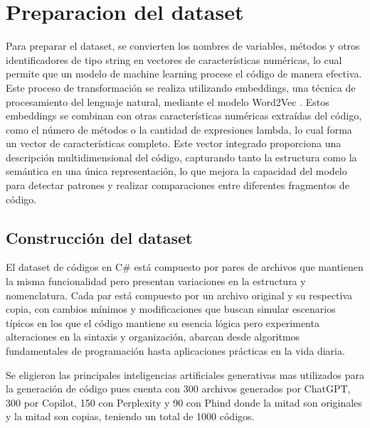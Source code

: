 \chapter{Preparacion del dataset}\label{chapter:proposal}

Para preparar el dataset, se convierten los nombres de variables, métodos y otros identificadores de tipo string en vectores de características numéricas, lo cual permite que un modelo de machine learning procese el código de manera efectiva. Este proceso de transformación se realiza utilizando embeddings, una técnica de procesamiento del lenguaje natural, mediante el modelo Word2Vec \cite{mikolov2013efficient}. Estos embeddings se combinan con otras características numéricas extraídas del código, como el número de métodos o la cantidad de expresiones lambda, lo cual forma un vector de características completo. Este vector integrado proporciona una descripción multidimensional del código, capturando tanto la estructura como la semántica en una única representación, lo que mejora la capacidad del modelo para detectar patrones y realizar comparaciones entre diferentes fragmentos de código.

\section{Construcción del dataset}

El dataset de códigos en C\# está compuesto por pares de archivos que mantienen la misma funcionalidad pero presentan variaciones en la estructura y nomenclatura. Cada par está compuesto por un archivo original y su respectiva copia, con cambios mínimos y modificaciones que buscan simular escenarios típicos en los que el código mantiene su esencia lógica pero experimenta alteraciones en la sintaxis y organización, abarcan desde algoritmos fundamentales de programación hasta aplicaciones prácticas en la vida diaria.

 Se eligieron las principales inteligencias artificiales generativas mas utilizados para la generación de código pues cuenta con 300 archivos generados por ChatGPT, 300 por Copilot, 150 con Perplexity y 90 con Phind donde la mitad son originales y la mitad son copias, teniendo un total de 1000 códigos. 

